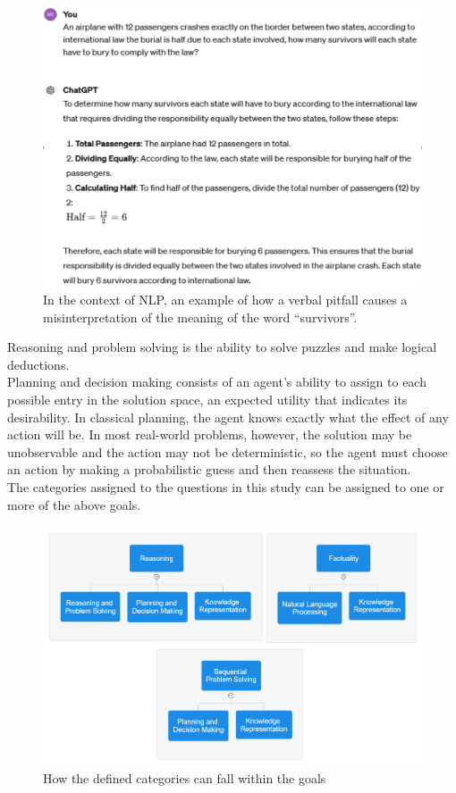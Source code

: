 \documentclass[12pt]{article}
\begin{document}
    \begin{figure}[H]
    \centering
            \includegraphics[width=1\textwidth]{NLPCommonSense.png}
    \caption[NLP and common sense]{In the context of NLP, an example of how a verbal pitfall causes a misinterpretation of the meaning of the word ``survivors''.}
    \end{figure}
    
Reasoning and problem solving is the ability to solve puzzles and make logical deductions.\\
Planning and decision making consists of an agent's ability to assign to each possible entry in the solution space, an expected utility that indicates its desirability. In classical planning, the agent knows exactly what the effect of any action will be. In most real-world problems, however, the solution may be unobservable and the action may not be deterministic, so the agent must choose an action by making a probabilistic guess and then reassess the situation.\\

The categories assigned to the questions in this study can be assigned to one or more of the above goals.

    \begin{figure}[H]
    \centering
            \includegraphics[width=1\textwidth]{GoalsAndCategory.png}
    \caption[AI goals and questions category]{How the defined categories can fall within the goals}
    \end{figure}
    
\end{document}
